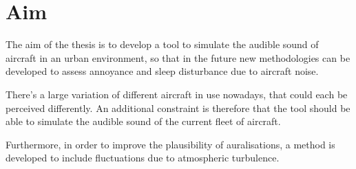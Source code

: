 \newpage
\section{Aim}


The aim of the thesis is to develop a tool to simulate the audible sound of
aircraft in an urban environment, so that in the future new methodologies can be
developed to assess annoyance and sleep disturbance due to aircraft noise.

There's a large variation of different aircraft in use nowadays, that could each
be perceived differently. An additional constraint is therefore that the tool
should be able to simulate the audible sound of the current fleet of aircraft.

Furthermore, in order to improve the plausibility of auralisations, a method is
developed to include fluctuations due to atmospheric turbulence.


%
%
%

